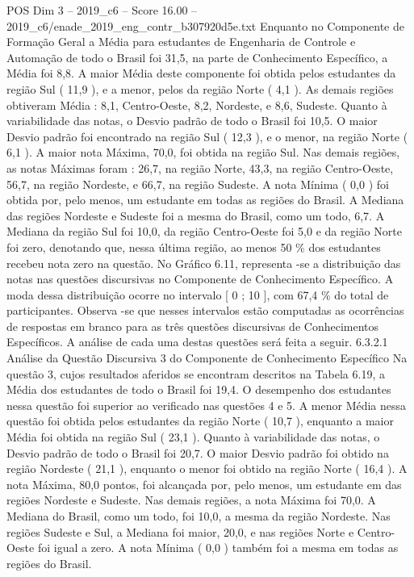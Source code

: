 \begin{textsample}{POS Dim 3 – 2019\_c6 – Score 16.00 – 2019\_c6/enade\_2019\_eng\_contr\_b307920d5e.txt}
Enquanto no Componente de Formação Geral a Média para estudantes de Engenharia de Controle e Automação de todo o Brasil foi 31,5, na parte de Conhecimento Específico, a Média foi 8,8.
A maior Média deste componente foi obtida pelos estudantes da região Sul ( 11,9 ), e a menor, pelos da região Norte ( 4,1 ).
As demais regiões obtiveram Média : 8,1, Centro-Oeste, 8,2, Nordeste, e 8,6, Sudeste.
Quanto à variabilidade das notas, o Desvio padrão de todo o Brasil foi 10,5.
O maior Desvio padrão foi encontrado na região Sul ( 12,3 ), e o menor, na região Norte ( 6,1 ).
A maior nota Máxima, 70,0, foi obtida na região Sul.
Nas demais regiões, as notas Máximas foram : 26,7, na região Norte, 43,3, na região Centro-Oeste, 56,7, na região Nordeste, e 66,7, na região Sudeste.
A nota Mínima ( 0,0 ) foi obtida por, pelo menos, um estudante em todas as regiões do Brasil.
A Mediana das regiões Nordeste e Sudeste foi a mesma do Brasil, como um todo, 6,7.
A Mediana da região Sul foi 10,0, da região Centro-Oeste foi 5,0 e da região Norte foi zero, denotando que, nessa última região, ao menos 50 \% dos estudantes recebeu nota zero na questão.
No Gráfico 6.11, representa -se a distribuição das notas nas questões discursivas no Componente de Conhecimento Específico.
A moda dessa distribuição ocorre no intervalo [ 0 ; 10 ], com 67,4 \% do total de participantes.
Observa -se que nesses intervalos estão computadas as ocorrências de respostas em branco para as três questões discursivas de Conhecimentos Específicos.
A análise de cada uma destas questões será feita a seguir. 6.3.2.1 Análise da Questão Discursiva 3 do Componente de Conhecimento Específico Na questão 3, cujos resultados aferidos se encontram descritos na Tabela 6.19, a Média dos estudantes de todo o Brasil foi 19,4.
O desempenho dos estudantes nessa questão foi superior ao verificado nas questões 4 e 5.
A menor Média nessa questão foi obtida pelos estudantes da região Norte ( 10,7 ), enquanto a maior Média foi obtida na região Sul ( 23,1 ).
Quanto à variabilidade das notas, o Desvio padrão de todo o Brasil foi 20,7.
O maior Desvio padrão foi obtido na região Nordeste ( 21,1 ), enquanto o menor foi obtido na região Norte ( 16,4 ).
A nota Máxima, 80,0 pontos, foi alcançada por, pelo menos, um estudante em das regiões Nordeste e Sudeste.
Nas demais regiões, a nota Máxima foi 70,0.
A Mediana do Brasil, como um todo, foi 10,0, a mesma da região Nordeste.
Nas regiões Sudeste e Sul, a Mediana foi maior, 20,0, e nas regiões Norte e Centro-Oeste foi igual a zero.
A nota Mínima ( 0,0 ) também foi a mesma em todas as regiões do Brasil.

\end{textsample}
